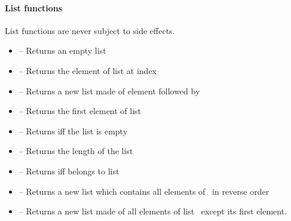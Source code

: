 \paragraph{List functions}

List functions are never subject to side effects.

\begin{itemize}
	\item {} -- Returns an empty list

	\item {} -- Returns the element of list  at index 

	\item \label{item:lbl-list_cons}  -- Returns a new list made of element  followed by 

	\item \label{item:lbl-list_hd}  -- Returns the first element of list~

	\item \label{item:lbl-list_is_empty}  -- Returns  iff the list  is empty

	\item \label{item:lbl-list_length}  -- Returns the length of the list 

	\item \label{item:lbl-list_mem}  -- Returns  iff  belongs to list~

	\item \label{item:lbl-list_rev}  -- Returns a new list which contains all elements of~ in reverse order

	\item \label{item:lbl-list_tl}  -- Returns a new list made of all elements of list~ except its first element.
\end{itemize}

